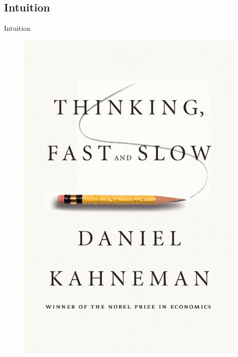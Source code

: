 \subsection{Intuition}
\begin{frame}{Intuition}
    \begin{figure}
        \begin{minipage}[t]{0.30\linewidth}
            \centering
            \vspace{0pt}
            \includegraphics[width=\textwidth]{img/TFS.jpg}
        \end{minipage}

\end{figure}
\end{frame}
